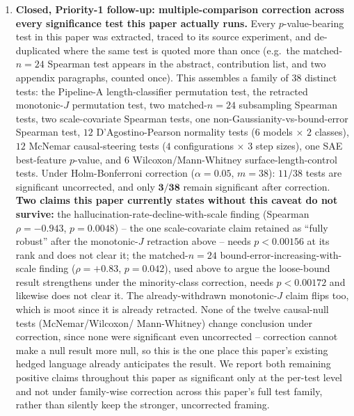\documentclass[onecolumn]{jmlr}
\begin{document}
\begin{enumerate}[leftmargin=*, topsep=2pt, itemsep=2pt]
\item \textbf{Closed, Priority-1 follow-up: multiple-comparison
  correction across every significance test this paper actually
  runs.} Every $p$-value-bearing test in this paper was extracted,
  traced to its source experiment, and de-duplicated where the same
  test is quoted more than once (e.g.\ the matched-$n{=}24$ Spearman
  test appears in the abstract, contribution list, and two appendix
  paragraphs, counted once). This assembles a family of $38$ distinct
  tests: the Pipeline-A length-classifier permutation test, the
  retracted monotonic-$J$ permutation test, two matched-$n{=}24$
  subsampling Spearman tests, two scale-covariate Spearman tests, one
  non-Gaussianity-vs-bound-error Spearman test, $12$ D'Agostino-Pearson
  normality tests ($6$ models $\times$ $2$ classes), $12$ McNemar
  causal-steering tests ($4$ configurations $\times$ $3$ step sizes),
  one SAE best-feature $p$-value, and $6$ Wilcoxon/Mann-Whitney
  surface-length-control tests. Under Holm-Bonferroni correction
  ($\alpha=0.05$, $m=38$): $11/38$ tests are significant uncorrected,
  and only $\mathbf{3/38}$ remain significant after correction.
  \textbf{Two claims this paper currently states without this caveat
  do not survive:} the hallucination-rate-decline-with-scale finding
  (Spearman $\rho=-0.943$, $p=0.0048$) -- the one scale-covariate
  claim retained as ``fully robust'' after the monotonic-$J$ retraction
  above -- needs $p<0.00156$ at its rank and does not clear it; the
  matched-$n{=}24$ bound-error-increasing-with-scale finding
  ($\rho={+}0.83$, $p=0.042$), used above to argue the loose-bound
  result strengthens under the minority-class correction, needs
  $p<0.00172$ and likewise does not clear it. The already-withdrawn
  monotonic-$J$ claim flips too, which is moot since it is already
  retracted. None of the twelve causal-null tests (McNemar/Wilcoxon/
  Mann-Whitney) change conclusion under correction, since none were
  significant even uncorrected -- correction cannot make a null result
  more null, so this is the one place this paper's existing hedged
  language already anticipates the result. We report both remaining
  positive claims throughout this paper as significant only at the
  per-test level and not under family-wise correction across this
  paper's full test family, rather than silently keep the stronger,
  uncorrected framing.

\end{enumerate}

\FloatBarrier
\end{document}
